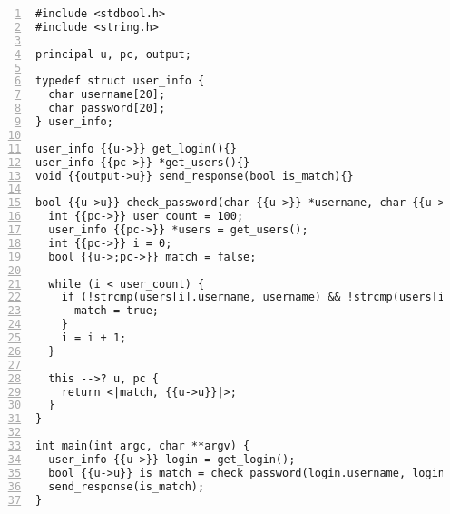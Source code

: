 \begin{lstlisting}[float, style=dlmc, numbers=left, caption={Labelled password checker example}, label=example:code:check_password-explicit]
#include <stdbool.h>
#include <string.h>

principal u, pc, output;

typedef struct user_info {
  char username[20];
  char password[20];
} user_info;

user_info {{u->}} get_login(){}
user_info {{pc->}} *get_users(){}
void {{output->u}} send_response(bool is_match){}

bool {{u->u}} check_password(char {{u->}} *username, char {{u->}} *password) {
  int {{pc->}} user_count = 100;
  user_info {{pc->}} *users = get_users();
  int {{pc->}} i = 0;
  bool {{u->;pc->}} match = false;

  while (i < user_count) {
    if (!strcmp(users[i].username, username) && !strcmp(users[i].password, password)) {
      match = true;
    }
    i = i + 1;
  }

  this -->? u, pc {
    return <|match, {{u->u}}|>;
  }
}

int main(int argc, char **argv) {
  user_info {{u->}} login = get_login();
  bool {{u->u}} is_match = check_password(login.username, login.password);
  send_response(is_match);
}
\end{lstlisting}
